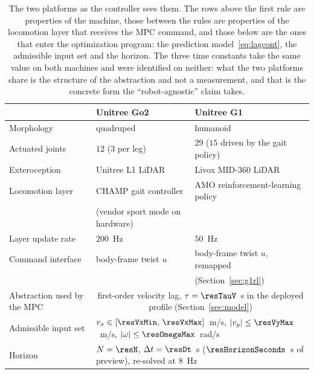 \documentclass[11pt,a4paper]{article}
\begin{document}
\begin{table}[htbp]
  \centering
  \small
  \caption{The two platforms as the controller sees them. The rows above the first rule are properties of the
  machine, those between the rules are properties of the locomotion layer that receives the MPC command, and
  those below are the ones that enter the optimization program: the prediction model~\eqref{eq:lagcont}, the
  admissible input set and the horizon. The three
  time constants take the same value on both machines and were identified on neither: what the two platforms
  share is the structure of the abstraction and not a measurement, and that is the concrete form the
  ``robot-agnostic'' claim takes.}
  \label{tab:platforms}
  \begin{tabular}{lll}
    \toprule
                                  & Unitree Go2                     & Unitree G1 \\
    \midrule
    Morphology                    & quadruped                       & humanoid \\
    Actuated joints               & $12$ ($3$ per leg)              & $29$ ($15$ driven by the gait policy) \\
    Exteroception                 & Unitree L1 LiDAR                & Livox MID-360 LiDAR \\
    \midrule
    Locomotion layer              & CHAMP gait controller           & AMO reinforcement-learning policy \\
                                  & (vendor sport mode on hardware) & \\
    Layer update rate             & $200$~Hz                        & $50$~Hz \\
    Command interface             & body-frame twist $u$            & body-frame twist $u$, remapped \\
                                  &                                 & (Section~\ref{sec:g1rl}) \\
    \midrule
    Abstraction used by the MPC   & \multicolumn{2}{c}{first-order velocity lag, $\tau=\resTauV$~s in the deployed profile (Section~\ref{sec:model})} \\
    Admissible input set          & \multicolumn{2}{l}{$v_x\in[\resVxMin,\,\resVxMax]$~m/s, $|v_y|\le\resVyMax$~m/s, $|\omega|\le\resOmegaMax$~rad/s} \\
    Horizon                       & \multicolumn{2}{l}{$N=\resN$, $\Delta t=\resDt$~s ($\resHorizonSeconds$~s of preview), re-solved at $8$~Hz} \\
    \bottomrule
  \end{tabular}
\end{table}
\end{document}
